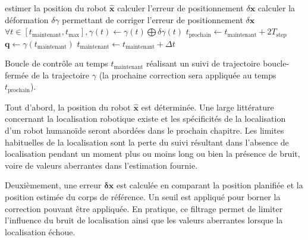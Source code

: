 \begin{algorithm}
  \begin{algorithmic}
    \STATE estimer la position du robot $\mathbf{\hat{x}}$
    \STATE calculer l'erreur de positionnement $\delta \mathbf{x}$
    \STATE calculer la déformation $\delta \gamma$ permettant de
    corriger l'erreur de positionnement $\delta \mathbf{x}$
    \STATE $\forall t \in [t_{\text{maintenant}}, t_{\text{max}}],
    \gamma(t) \leftarrow \gamma(t) \bigoplus \delta \gamma(t)$
    \STATE $t_{\text{prochain}} \leftarrow t_{\text{maintenant}} + 2 T_{\text{step}}$
    \ENDIF
    \ENDIF
    \STATE $\mathbf{q} \leftarrow \gamma(t_{\text{maintenant}})$
    \STATE $t_{\text{maintenant}} \leftarrow t_{\text{maintenant}} + \Delta t$
  \end{algorithmic}
  \caption{Boucle de contrôle au temps $t_{\text{maintenant}}$ réalisant
    un suivi de trajectoire boucle-fermée de la trajectoire $\gamma$
    (la prochaine correction sera appliquée au temps
    $t_{\text{prochain}}$). \label{fig:control_loop}}
\end{algorithm}

Tout d'abord, la position du robot $\hat{\mathbf{x}}$ est
déterminée. Une large littérature concernant la localisation robotique
existe \cite{08stasse.ijhr, 06thompson.humanoids} et les spécificités
de la localisation d'un robot humanoïde seront abordées dans le
prochain chapitre. Les limites habituelles de la localisation sont la
perte du suivi résultant dans l'absence de localisation pendant un
moment plus ou moins long ou bien la présence de bruit, voire de
valeurs aberrantes dans l'estimation fournie.

Deuxièmement, une erreur $\mathbf{\delta \mathbf{x}}$ est calculée en
comparant la position planifiée et la position estimée du corps de
référence. Un seuil est appliqué pour borner la correction pouvant
être appliquée. En pratique, ce filtrage permet de limiter l'influence
du bruit de localisation ainsi que les valeurs aberrantes lorsque la
localisation échoue.


